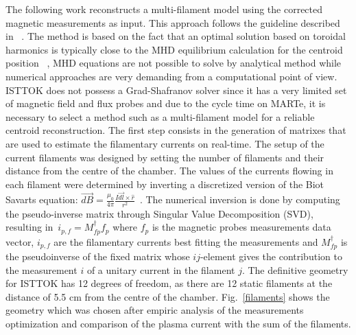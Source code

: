 The following work reconstructs a multi-filament model using the corrected magnetic measurements as input. This approach follows the guideline described in ~\cite[Chapter~3]{PirontiBook}. The method is based on the fact that an optimal solution based on toroidal harmonics is typically close to the MHD equilibrium calculation for the centroid position ~\cite[Chapter~3]{PirontiBook}, MHD equations are not possible to solve by analytical method while numerical approaches are very demanding from a computational point of view. ISTTOK does not possess a Grad-Shafranov solver since it  has a very limited set of magnetic field and flux probes and due to the cycle time on MARTe, it is necessary to select a method such as a multi-filament model for a reliable centroid reconstruction.  The first step consists in the generation of  matrixes that are used to estimate the filamentary currents on real-time. The setup of the current filaments was designed by setting the number of filaments and their distance from the centre of the chamber. The values of the currents flowing in each filament were determined by inverting a discretized version of the Biot Savart\textquotesingle s equation: $ \Vec{dB}=\frac{\mu_0}{4\pi}\frac{I\Vec{dl}\times \hat{r}}{r^2} \,$ . The numerical inversion is done by computing the pseudo-inverse matrix through Singular Value Decomposition (SVD), resulting in  $\, i_{p,f}=M^{\dagger}_{fp}f_p$ where $f_{p}$ is the  magnetic probes measurements data vector, $i_{p,f}$ are the  filamentary currents best fitting the measurements and $M^{\dagger}_{fp}$ is the pseudoinverse of the fixed matrix whose $ij$-element gives the contribution to the measurement  $i$ of a unitary current in the filament $j$. The definitive geometry for ISTTOK has 12 degrees of freedom, as there are 12 static filaments at the distance of 5.5 cm from the centre of the chamber. Fig.~\ref{filaments} shows the geometry  which was chosen  after  empiric  analysis  of  the  measurements  optimization  and comparison  of  the  plasma  current  with  the  sum  of  the  filaments.




